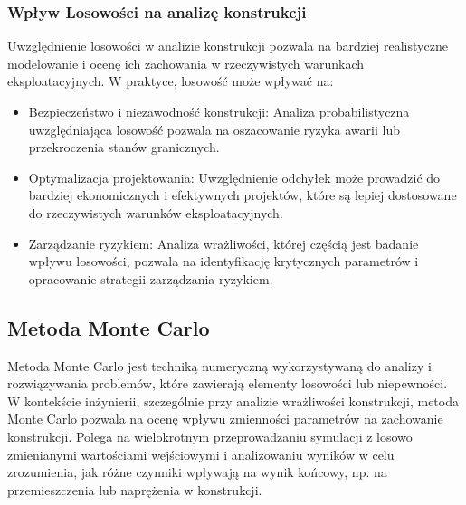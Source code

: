 \subsubsection*{Wpływ Losowości na analizę konstrukcji}

Uwzględnienie losowości w analizie konstrukcji pozwala na bardziej realistyczne modelowanie i ocenę ich zachowania w rzeczywistych warunkach eksploatacyjnych.
W praktyce, losowość może wpływać na:

\begin{itemize}
    \item Bezpieczeństwo i niezawodność konstrukcji: Analiza probabilistyczna uwzględniająca losowość pozwala na oszacowanie ryzyka awarii lub przekroczenia stanów granicznych.
    \item Optymalizacja projektowania: Uwzględnienie odchyłek może prowadzić do bardziej ekonomicznych i efektywnych projektów, które są lepiej dostosowane do rzeczywistych warunków eksploatacyjnych.
    \item Zarządzanie ryzykiem: Analiza wrażliwości, której częścią jest badanie wpływu losowości, pozwala na identyfikację krytycznych parametrów i opracowanie strategii zarządzania ryzykiem.
\end{itemize}

\subsection{Metoda Monte Carlo}

Metoda Monte Carlo jest techniką numeryczną wykorzystywaną do analizy i rozwiązywania problemów, które zawierają elementy losowości lub niepewności.
W kontekście inżynierii, szczególnie przy analizie wrażliwości konstrukcji, metoda Monte Carlo pozwala na ocenę wpływu zmienności parametrów na zachowanie konstrukcji.
Polega na wielokrotnym przeprowadzaniu symulacji z losowo zmienianymi wartościami wejściowymi i analizowaniu wyników w celu zrozumienia, jak różne czynniki wpływają na wynik końcowy, np. na przemieszczenia lub naprężenia w konstrukcji.

